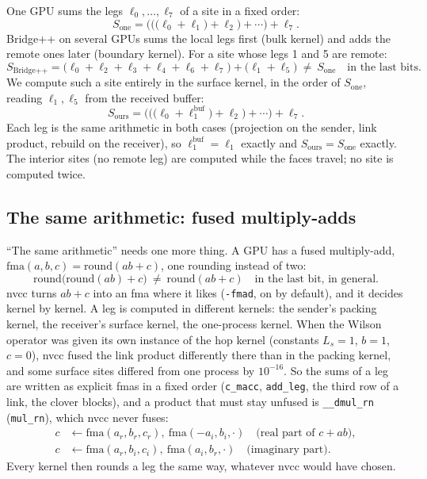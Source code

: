 \documentclass[11pt,a4paper]{article}
\numberwithin{equation}{section}
\newcommand{\code}[1]{\texttt{\small #1}}
\begin{document}
One GPU sums the legs $\ell_0,\dots,\ell_7$ of a site in a fixed order:
\begin{equation}
S_{\text{one}} = \big(\big(\big(\ell_0+\ell_1\big)+\ell_2\big)+\cdots\big)+\ell_7 .
\end{equation}
Bridge++ on several GPUs sums the local legs first (bulk kernel) and adds the remote ones later
(boundary kernel). For a site whose legs 1 and 5 are remote:
\begin{equation}
S_{\text{Bridge++}} = \big(\ell_0+\ell_2+\ell_3+\ell_4+\ell_6+\ell_7\big) + \big(\ell_1+\ell_5\big)
\ \neq\ S_{\text{one}}\quad\text{in the last bits.}
\end{equation}
We compute such a site entirely in the surface kernel, in the order of $S_{\text{one}}$, reading
$\ell_1,\ell_5$ from the received buffer:
\begin{equation}
S_{\text{ours}} = \big(\big(\big(\ell_0+\ell_1^{\text{buf}}\big)+\ell_2\big)+\cdots\big)+\ell_7 .
\end{equation}
Each leg is the same arithmetic in both cases (projection on the sender, link product, rebuild on
the receiver), so $\ell_1^{\text{buf}}=\ell_1$ exactly and $S_{\text{ours}}=S_{\text{one}}$
exactly. The interior sites (no remote leg) are computed while the faces travel; no site is
computed twice.

\subsection{The same arithmetic: fused multiply-adds}

``The same arithmetic'' needs one more thing. A GPU has a fused multiply-add,
$\mathrm{fma}(a,b,c) = \mathrm{round}(ab+c)$, one rounding instead of two:
\begin{equation}
\mathrm{round}\big(\mathrm{round}(ab)+c\big)\ \neq\ \mathrm{round}(ab+c)\quad\text{in the last bit, in general.}
\end{equation}
nvcc turns $ab+c$ into an fma where it likes (\code{-fmad}, on by default), and it decides kernel by
kernel. A leg is computed in different kernels: the sender's packing kernel, the receiver's
surface kernel, the one-process kernel. When the Wilson operator was given its own instance of
the hop kernel (constants $L_s=1$, $b=1$, $c=0$), nvcc fused the link product differently there
than in the packing kernel, and some surface sites differed from one process by $10^{-16}$. So
the sums of a leg are written as explicit fmas in a fixed order (\code{c\_macc}, \code{add\_leg},
the third row of a link, the clover blocks), and a product that must stay unfused is
\code{\_\_dmul\_rn} (\code{mul\_rn}), which nvcc never fuses:
\begin{align}
c &\leftarrow \mathrm{fma}(a_r,b_r,c_r),\ \mathrm{fma}(-a_i,b_i,\cdot)\quad\text{(real part of } c+ab),\\
c &\leftarrow \mathrm{fma}(a_r,b_i,c_i),\ \mathrm{fma}(a_i,b_r,\cdot)\quad\text{(imaginary part)}.
\end{align}
Every kernel then rounds a leg the same way, whatever nvcc would have chosen.
\end{document}
